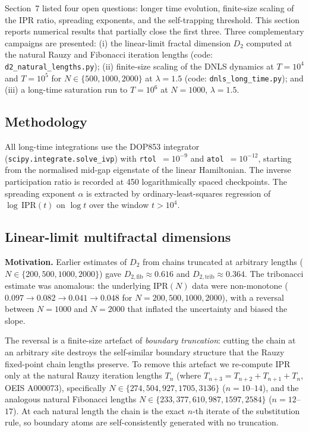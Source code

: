 \documentclass[12pt,a4paper]{article}
\begin{document}
Section~7 listed four open questions: longer time
evolution, finite-size scaling of the IPR ratio, spreading exponents, and the
self-trapping threshold.  This section reports numerical results that
partially close the first three.  Three complementary campaigns are
presented: (i) the linear-limit fractal dimension $D_2$ computed at the
natural Rauzy and Fibonacci iteration lengths (code: \texttt{d2\_natural\_lengths.py});
(ii) finite-size scaling of the DNLS dynamics at $T = 10^4$ and $T = 10^5$
for $N \in \{500, 1000, 2000\}$ at $\lambda = 1.5$ (code:
\texttt{dnls\_long\_time.py}); and (iii) a long-time saturation run to
$T = 10^6$ at $N = 1000$, $\lambda = 1.5$.

\subsection{Methodology}
\label{subsec:fss-method}

All long-time integrations use the DOP853 integrator (\texttt{scipy.integrate.solve\_ivp})
with \texttt{rtol}~$= 10^{-9}$ and \texttt{atol}~$= 10^{-12}$, starting from the
normalised mid-gap eigenstate of the linear Hamiltonian.  The inverse
participation ratio is recorded at 450 logarithmically spaced checkpoints.
The spreading exponent $\alpha$ is extracted by ordinary-least-squares
regression of $\log\,\mathrm{IPR}(t)$ on $\log t$ over the window $t > 10^4$.

\subsection{Linear-limit multifractal dimensions}
\label{subsec:d2-natural}

\textbf{Motivation.}
Earlier estimates of $D_2$ from chains truncated at arbitrary lengths
($N \in \{200, 500, 1000, 2000\}$) gave $D_{2,\mathrm{fib}} \approx 0.616$
and $D_{2,\mathrm{trib}} \approx 0.364$.  The tribonacci estimate was
anomalous: the underlying $\mathrm{IPR}(N)$ data were non-monotone
($0.097 \to 0.082 \to 0.041 \to 0.048$ for $N = 200, 500, 1000, 2000$),
with a reversal between $N = 1000$ and $N = 2000$ that inflated the
uncertainty and biased the slope.

The reversal is a finite-size artefact of \emph{boundary truncation}:
cutting the chain at an arbitrary site destroys the self-similar boundary
structure that the Rauzy fixed-point chain lengths preserve.  To remove this
artefact we re-compute IPR only at the natural Rauzy iteration lengths $T_n$
(where $T_{n+3} = T_{n+2} + T_{n+1} + T_n$, OEIS A000073), specifically
$N \in \{274, 504, 927, 1705, 3136\}$ ($n = 10$--$14$), and the analogous
natural Fibonacci lengths $N \in \{233, 377, 610, 987, 1597, 2584\}$
($n = 12$--$17$).  At each natural length the chain is the exact $n$-th
iterate of the substitution rule, so boundary atoms are self-consistently
generated with no truncation.
\end{document}

